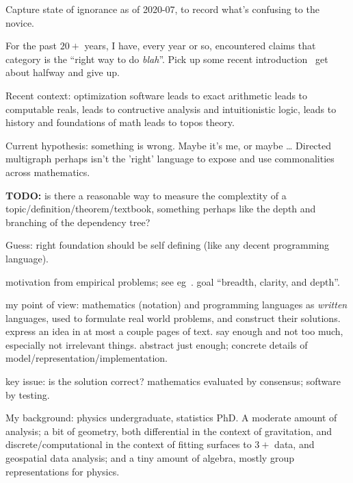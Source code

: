 \documentclass[11pt,openany]{article}
\begin{document}
Capture state of ignorance as of 2020-07,
to record what's confusing to the novice.

For the past $20+$ years, I have, every year or so,
 encountered claims that
category is the ``right way to do \textit{blah}''.
Pick up some recent 
introduction~\cite{adamek-herrlich-strecker-1990,
asperti-longo-1991,awodey-2010,
barr-wells-2020,fong-spivakd-2018-seven-sketches,
geroch-1985,lawvere-schanuel-2009,
leinster-2016-basic-category-theory,
maclane-1998-working-mathematician,nLab-2020,
riehl-2017,
spivakd-2013,spivakd-2014} 
get about halfway and give up.

Recent context: optimization software leads to
exact arithmetic leads to computable reals,
leads to contructive analysis and intuitionistic logic,
leads to history and foundations of math 
leads to topos theory.


Current hypothesis: something is wrong.
Maybe it's me, or maybe \ldots
Directed multigraph perhaps isn't the 'right' language to
expose and use commonalities across mathematics.

\textbf{TODO:} is there a reasonable way to measure 
the complextity of a topic/definition/theorem/textbook,
something perhaps like the depth and branching of the
dependency tree?

Guess: right foundation should be self defining
(like any decent programming language).

motivation from empirical problems; 
see eg~\cite{maclane1981mathModels}.
goal ``breadth, clarity, and depth''.

my point of view: 
mathematics (notation) and programming languages
as \textit{written} languages,
used to formulate real world problems,
and construct their solutions.
express an idea in at most a couple pages of text.
say enough and not too much, especially not irrelevant things.
abstract just enough; 
concrete details of model/representation/implementation.

key issue: is the solution correct?
mathematics evaluated by consensus;
software by testing.

My background: physics undergraduate, statistics PhD.
A moderate amount of analysis; 
a bit of geometry, both
differential in the context of gravitation, and
discrete/computational in the context of fitting surfaces to
$3+$ data, and geospatial data analysis;
and a tiny amount of algebra, mostly group representations
for physics.
\end{document}
